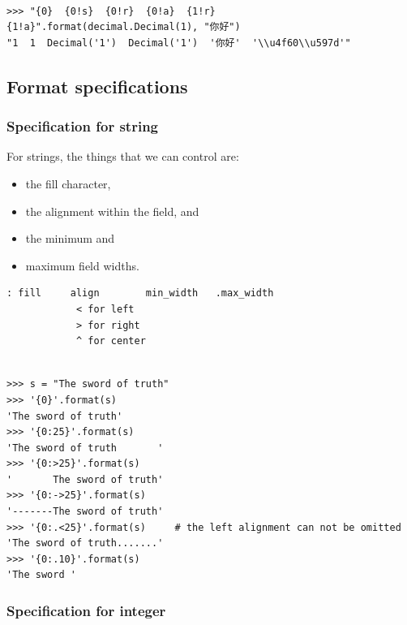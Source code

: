 \begin{lstlisting}

>>> "{0}  {0!s}  {0!r}  {0!a}  {1!r}  {1!a}".format(decimal.Decimal(1), "你好")
"1  1  Decimal('1')  Decimal('1')  '你好'  '\\u4f60\\u597d'"
\end{lstlisting}



\subsection{Format specifications}

\subsubsection{Specification for string}

For strings, the things that we can control are:
\begin{itemize}
\item the fill character, 
\item the alignment within the field, and 
\item the minimum and 
\item maximum field widths.
\end{itemize}

\begin{tcolorbox}
\begin{verbatim}
: fill     align        min_width   .max_width
            < for left
            > for right
            ^ for center
\end{verbatim}
\end{tcolorbox}


\begin{lstlisting}

>>> s = "The sword of truth"
>>> '{0}'.format(s)
'The sword of truth'
>>> '{0:25}'.format(s)
'The sword of truth       '
>>> '{0:>25}'.format(s)
'       The sword of truth'
>>> '{0:->25}'.format(s)
'-------The sword of truth'
>>> '{0:.<25}'.format(s)     # the left alignment can not be omitted
'The sword of truth.......'
>>> '{0:.10}'.format(s)
'The sword '
\end{lstlisting}


\subsubsection{Specification for integer}

